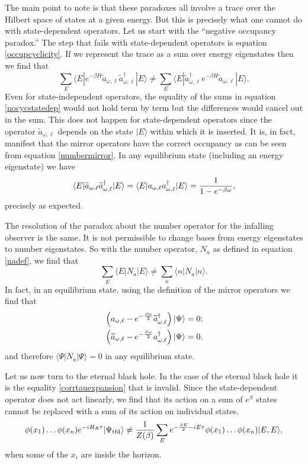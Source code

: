 \documentclass[12pt]{article}
\newcommand{\tfd}{\Psi_{\text{tfd}}} %
\newcommand{\cop}[1]{#1}
\def\ta{\widetilde{\cop{a}}}
\newcommand{\be}{\begin{equation}}
\newcommand{\ee}{\end{equation}}
\begin{document}
The main point to note  is that these paradoxes all involve a trace over the Hilbert space of states at a given energy. But this is precisely what one cannot do with state-dependent operators. Let us start with the ``negative occupancy paradox.'' The step that fails with state-dependent operators is equation \eqref{occupcyclicity}. If we represent the trace as a sum over energy eigenstates then we find that
\be
\label{nocycstatedep}
\sum_{E} \langle E| e^{-\beta H} \ta_{\omega, \ell} \ta_{\omega, \ell}^{\dagger} | E \rangle  \neq \sum_{E} \langle E| \ta_{\omega, \ell}^{\dagger} e^{-\beta H} \ta_{\omega, \ell} | E \rangle.
\ee
Even for state-independent operators, the equality of the sums in equation \eqref{nocycstatedep} would not hold term by term but the differences would cancel out in the sum. This does not happen for state-dependent operators
since the operator $\ta_{\omega, \ell}$ depends on the state $|E \rangle$ within which it is inserted. It is, in fact, manifest that the mirror operators have the correct occupancy as can be seen from equation \eqref{numbermirror}. In any
equilibrium state (including an energy eigenstate) we have
\be
\langle E| \ta_{\omega, \ell} \ta_{\omega, \ell}^{\dagger} | E \rangle = \langle E| a_{\omega, \ell} a_{\omega, \ell}^{\dagger} | E \rangle = {1 \over 1 - e^{-\beta \omega}},
\ee
precisely as expected.

The resolution of the paradox about the number operator for the infalling observer  is the same. It is not permissible to change bases from energy eigenstates to number eigenstates. So with the number operator, $N_a$ as defined
in equation \eqref{nadef}, we  find that
\be
\sum_{E} \langle E | N_a | E \rangle  \neq \sum_n \langle n | N_a | n \rangle.
\ee
In fact, in an equilibrium state, using the definition of the mirror operators we find that
\be
\begin{split}
&\left(a_{\omega, \ell}- e^{-{\beta \omega\over 2} } \ta_{\omega, \ell}^{\dagger} \right) | \Psi \rangle = 0; \\
&\left( \ta_{\omega, \ell}- e^{-{\beta \omega\over 2} }a_{\omega, \ell}^{\dagger} \right) | \Psi \rangle = 0.
\end{split}
\ee
and therefore $\langle \Psi | N_a |\Psi \rangle = 0$ in any equilibrium state.

Let us now turn to the eternal black hole. In the case of the eternal black hole it is the equality \eqref{corrtauexpansion} that is invalid. Since the state-dependent operator does not act linearly, we find that its action
on a sum of $e^{S}$ states cannot be replaced with a sum of its action on individual states.
\be
 \phi(x_1) \ldots \phi(x_n) e^{-i H_R \tau} |\tfd \rangle \neq  {1 \over Z(\beta)} \sum_{E} e^{-{\beta E \over 2} - i E \tau}  \phi(x_1) \ldots \phi(x_n) | E, E \rangle,
\ee
when some of the $x_i$ are inside the horizon.
\end{document}
